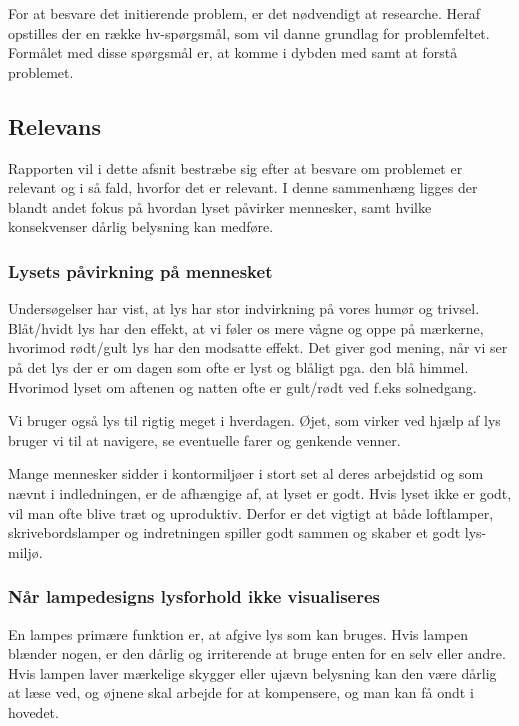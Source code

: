 For at besvare det initierende problem, er det nødvendigt at researche. Heraf opstilles der en række hv-spørgsmål, som vil danne grundlag for problemfeltet. Formålet med disse spørgsmål er, at komme i dybden med samt at forstå problemet.

\subsection{Relevans}
Rapporten vil i dette afsnit bestræbe sig efter at besvare om problemet er relevant og i så fald, hvorfor det er relevant. I denne sammenhæng ligges der blandt andet fokus på hvordan lyset påvirker mennesker, samt hvilke konsekvenser dårlig belysning kan medføre. 

\subsubsection{Lysets påvirkning på mennesket}

Undersøgelser har vist, at lys har stor indvirkning på vores humør og trivsel.
Blåt/hvidt lys har den effekt, at vi føler os mere vågne og oppe på mærkerne, hvorimod rødt/gult lys har den modsatte effekt\cite{videnskab_dk_paavirkning}. Det giver god mening, når vi ser på det lys der er om dagen som ofte er lyst og blåligt pga. den blå himmel. Hvorimod lyset om aftenen og natten ofte er gult/rødt ved f.eks solnedgang.

Vi bruger også lys til rigtig meget i hverdagen. Øjet, som virker ved hjælp af lys bruger vi til at navigere, se eventuelle farer og genkende venner.

Mange mennesker sidder i kontormiljøer i stort set al deres arbejdstid og som nævnt i indledningen, er de afhængige af, at lyset er godt. Hvis lyset ikke er godt, vil man ofte blive træt og uproduktiv. Derfor er det vigtigt at både loftlamper, skrivebordslamper og indretningen spiller godt sammen og skaber et godt lys-miljø.


\subsubsection{Når lampedesigns lysforhold ikke visualiseres}

En lampes primære funktion er, at afgive lys som kan bruges. Hvis lampen blænder nogen, er den dårlig og irriterende at bruge enten for en selv eller andre. Hvis lampen laver mærkelige skygger eller ujævn belysning kan den være dårlig at læse ved, og øjnene skal arbejde for at kompensere, og man kan få ondt i hovedet\cite{lys_konsekvenser}.

